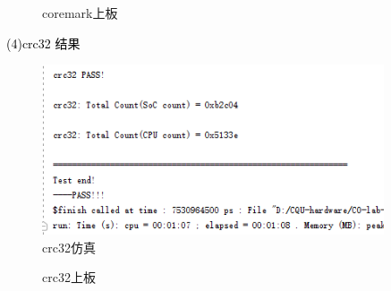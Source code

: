 \begin{figure}[htbp]
    \centering
    \caption{coremark上板}
\end{figure}

\newpage
\textcolor{black}{(4)crc32 结果}\\
\begin{figure}[htbp]
    \centering
    \includegraphics[width=0.9\textwidth]{image/crc32S.png}
    \caption{crc32仿真}
\end{figure}

\begin{figure}[htbp]
    \centering
    \caption{crc32上板}
\end{figure}


